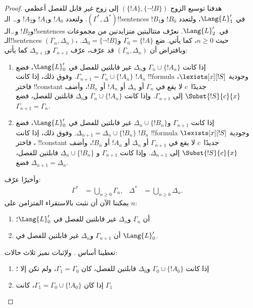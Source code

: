 \documentclass[../../../include/open-logic-section]{subfiles}
\begin{document}
\begin{proof}
هدفنا توسيع الزوج $(\{!A\},\{\lnot!B\})$ إلى زوج غير قابل للفصل
أعظمي $(\Gamma^*,\Delta^*)$. ولتعدد $!A_0$ و$!A_1$ و$!A_2$ و\dots
الـ!!{sentence}s في $\Lang{L}'_1$، ولتعدد $!B_0$ و$!B_1$ و$!B_2$
و\dots الـ!!{sentence}s في~$\Lang{L}'_2$. نعرّف متتاليتين متزايدتين من
مجموعات الـ!!{sentence}s $(\Gamma_n,\Delta_n)$، حيث $n \ge 0$، كما
يأتي. ضع $\Gamma_0=\{!A\}$ و$\Delta_0=\{\lnot !B\}$. وبافتراض أن
$(\Gamma_n,\Delta_n)$ قد عرّف، عرّف $\Gamma_{n+1}$ و$\Delta_{n+1}$
كما يأتي:
\begin{enumerate}
\item إذا كانت $\Gamma_n \cup \{!A_n\}$ و$\Delta_n$ غير قابلتين
  للفصل في $\Lang{L}'_0$، فضع
  $\Gamma_{n+1}=\Gamma_n \cup \{!A_n\}$. وفوق ذلك، إذا كانت $!A_n$
  !!{formula} وجودية $\lexists[x][!S]$، فاختر !!{constant} جديدًا~$c$
  لا يقع في $\Gamma_n$ أو $\Delta_n$ أو $!A_n$ أو $!B_n$، وأضف
  $\Subst{!S}{c}{x}$ إلى $\Gamma_{n+1}$. وإذا كانت
  $\Gamma_n \cup \{!A_n\}$ و$\Delta_n$ قابلتين للفصل، فضع
  $\Gamma_{n+1}=\Gamma_n$.
\item إذا كانت $\Gamma_{n+1}$ و$\Delta_n \cup \{!B_n\}$ غير قابلتين
  للفصل في $\Lang{L}'_0$، فضع
  $\Delta_{n+1}=\Delta_n \cup \{!B_n\}$. وفوق ذلك، إذا كانت $!B_n$
  !!{formula} وجودية $\lexists[x][!S]$، فاختر !!{constant} جديدًا~$c$
  لا يقع في $\Gamma_{n+1}$ أو $\Delta_n$ أو $!A_n$ أو $!B_n$، وأضف
  $\Subst{!S}{c}{x}$ إلى $\Delta_{n+1}$. وإذا كانت $\Gamma_{n+1}$ و
  $\Delta_n \cup \{!B_n\}$ قابلتين للفصل، فضع
  $\Delta_{n+1}=\Delta_n$.
\end{enumerate}
وأخيرًا عرّف:
\begin{align*}
  \Gamma^* & = \bigcup_{n\ge 0} \Gamma_n, &
  \Delta^* & = \bigcup_{n\ge 0} \Delta_n.
\end{align*}
يمكننا الآن أن نثبت بالاستقراء المتزامن على $n$:
\begin{enumerate}
\item{} أن $\Gamma_n$ و$\Delta_n$ غير قابلتين للفصل في
  $\Lang{L}'_0$؛
\item{} أن $\Gamma_{n+1}$ و$\Delta_n$ غير قابلتين للفصل
  في $\Lang{L}'_0$.
\end{enumerate}
تعطينا  أساس . ولإثبات
 نميز ثلاث حالات:
\begin{enumerate}
\item إذا كانت $\Gamma_0 \cup \{!A_0\}$ و$\Delta_0$ قابلتين للفصل،
  كان $\Gamma_1=\Gamma_0$، ولم تكن  إلا
  ؛
\item إذا كان $\Gamma_1=\Gamma_0 \cup \{!A_0\}$، كانت $\Gamma_1$

\end{enumerate}
\end{proof}
\end{document}
